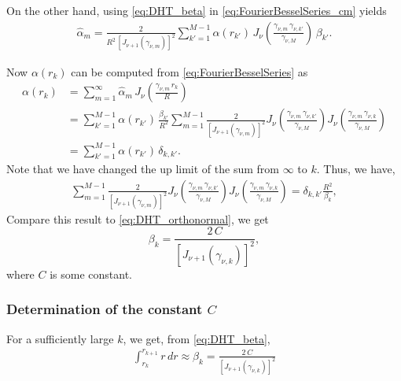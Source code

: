 \documentclass[preprint]{revtex4-1}
\numberwithin{equation}{subsection}
\numberwithin{table}{section}
\begin{document}
On the other hand,
using \eqref{eq:DHT_beta} in \eqref{eq:FourierBesselSeries_cm} yields
\begin{align*}
\hat\alpha_m
=
\frac{ 2 }
{ R^2 \, \left[ J_{\nu + 1}(\gamma_{\nu,m}) \right]^2 }
\sum_{k' = 1}^{M - 1}
\alpha(r_{k'}) \,
J_\nu\left( \frac{ \gamma_{\nu, m} \, \gamma_{\nu, k'} } { \gamma_{\nu, M} } \right)
\, \beta_{k'}.
\end{align*}

Now $\alpha(r_k)$ can be computed from \eqref{eq:FourierBesselSeries}
as
\begin{align*}
\alpha(r_k)
&= \sum_{m = 1}^\infty \hat\alpha_m \,
  J_\nu\left(
    \frac{ \gamma_{\nu, m} \, r_k } { R }
  \right)
\\
&=
  \sum_{k' = 1}^{M - 1}
  \alpha(r_{k'}) \,
  \frac{ \beta_{k'} }
  { R^2 }
  \sum_{m = 1}^{M - 1}
  \frac{ 2 }
  { \left[ J_{\nu + 1}(\gamma_{\nu,m}) \right]^2 }
  J_\nu\left(
    \frac{ \gamma_{\nu, m} \, \gamma_{\nu, k'} } { \gamma_{\nu, M} }
  \right)
  J_\nu\left(
    \frac{ \gamma_{\nu, m} \, \gamma_{\nu, k} } { \gamma_{\nu, M} }
  \right)
\\
&= \sum_{k' = 1}^{M - 1}
  \alpha(r_{k'}) \, \delta_{k, k'}.
\end{align*}
%
Note that we have changed the up limit of the sum from $\infty$ to $k$.
%
Thus, we have,
\begin{align*}
  \sum_{m = 1}^{M - 1}
  \frac{ 2 }
  { \left[ J_{\nu + 1}(\gamma_{\nu,m}) \right]^2 }
  J_\nu\left( \frac{ \gamma_{\nu, m} \, \gamma_{\nu, k'} } { \gamma_{\nu, M} } \right)
  J_\nu\left(
    \frac{ \gamma_{\nu, m} \, \gamma_{\nu, k} } { \gamma_{\nu, M} }
  \right)
  =
  \delta_{k, k'} \frac{ R^2 } { \beta_{k} },
\end{align*}
Compare this result to \eqref{eq:DHT_orthonormal},
we get
\[
  \beta_k
=
\frac{ 2 \, C } { [ J_{\nu + 1}(\gamma_{\nu, k}) ]^2 },
\]
where $C$ is some constant.



\subsubsection*{Determination of the constant $C$}

For a sufficiently large $k$,
we get, from \eqref{eq:DHT_beta},
\begin{align}
  \int_{r_k}^{r_{k+1}}
  r \, dr
\approx
  \beta_k
=
  \frac{ 2 \, C } { [ J_{\nu + 1}(\gamma_{\nu, k}) ]^2 }
  \label{eq:determ_C}
\end{align}
\end{document}

